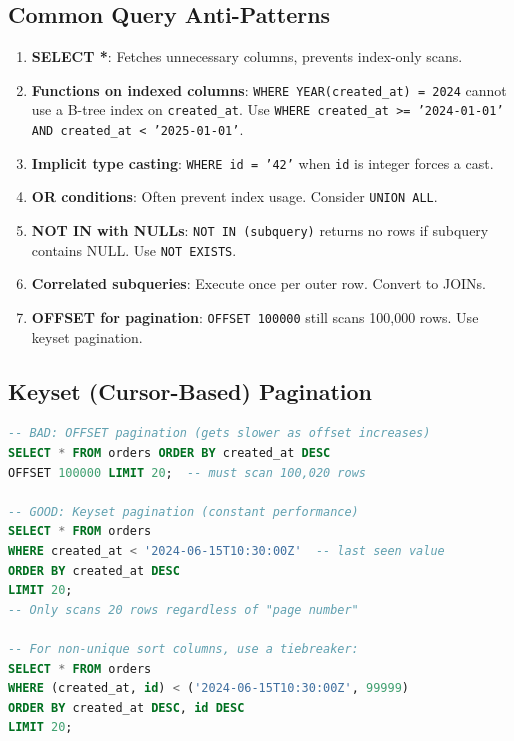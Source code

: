 \documentclass[12pt,a4paper]{article}
\begin{document}
\subsection{Common Query Anti-Patterns}

\begin{warnbox}
\begin{enumerate}
    \item \textbf{SELECT *}: Fetches unnecessary columns, prevents index-only scans.
    \item \textbf{Functions on indexed columns}: \texttt{WHERE YEAR(created\_at) = 2024} cannot use a B-tree index on \texttt{created\_at}. Use \texttt{WHERE created\_at >= '2024-01-01' AND created\_at < '2025-01-01'}.
    \item \textbf{Implicit type casting}: \texttt{WHERE id = '42'} when \texttt{id} is integer forces a cast.
    \item \textbf{OR conditions}: Often prevent index usage. Consider \texttt{UNION ALL}.
    \item \textbf{NOT IN with NULLs}: \texttt{NOT IN (subquery)} returns no rows if subquery contains NULL. Use \texttt{NOT EXISTS}.
    \item \textbf{Correlated subqueries}: Execute once per outer row. Convert to JOINs.
    \item \textbf{OFFSET for pagination}: \texttt{OFFSET 100000} still scans 100,000 rows. Use keyset pagination.
\end{enumerate}
\end{warnbox}

\subsection{Keyset (Cursor-Based) Pagination}

\begin{lstlisting}[language=SQL, caption={Keyset pagination vs OFFSET}]
-- BAD: OFFSET pagination (gets slower as offset increases)
SELECT * FROM orders ORDER BY created_at DESC
OFFSET 100000 LIMIT 20;  -- must scan 100,020 rows

-- GOOD: Keyset pagination (constant performance)
SELECT * FROM orders
WHERE created_at < '2024-06-15T10:30:00Z'  -- last seen value
ORDER BY created_at DESC
LIMIT 20;
-- Only scans 20 rows regardless of "page number"

-- For non-unique sort columns, use a tiebreaker:
SELECT * FROM orders
WHERE (created_at, id) < ('2024-06-15T10:30:00Z', 99999)
ORDER BY created_at DESC, id DESC
LIMIT 20;
\end{lstlisting}
\end{document}
